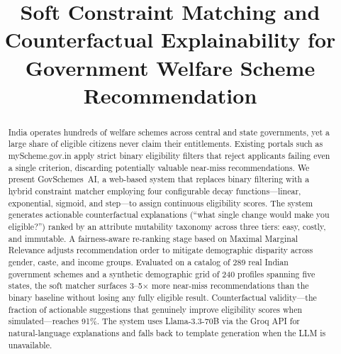 \documentclass[conference]{IEEEtran}
\begin{document}
\title{Soft Constraint Matching and Counterfactual Explainability for Government Welfare Scheme Recommendation}

\author{
}

\maketitle

\begin{abstract}
India operates hundreds of welfare schemes across central and state governments, yet a large share of eligible citizens never claim their entitlements. Existing portals such as myScheme.gov.in apply strict binary eligibility filters that reject applicants failing even a single criterion, discarding potentially valuable near-miss recommendations. We present GovSchemes~AI, a web-based system that replaces binary filtering with a hybrid constraint matcher employing four configurable decay functions---linear, exponential, sigmoid, and step---to assign continuous eligibility scores. The system generates actionable counterfactual explanations (``what single change would make you eligible?'') ranked by an attribute mutability taxonomy across three tiers: easy, costly, and immutable. A fairness-aware re-ranking stage based on Maximal Marginal Relevance adjusts recommendation order to mitigate demographic disparity across gender, caste, and income groups. Evaluated on a catalog of 289 real Indian government schemes and a synthetic demographic grid of 240 profiles spanning five states, the soft matcher surfaces 3--5$\times$ more near-miss recommendations than the binary baseline without losing any fully eligible result. Counterfactual validity---the fraction of actionable suggestions that genuinely improve eligibility scores when simulated---reaches 91\%. The system uses Llama-3.3-70B via the Groq API for natural-language explanations and falls back to template generation when the LLM is unavailable.
\end{abstract}
\end{document}
